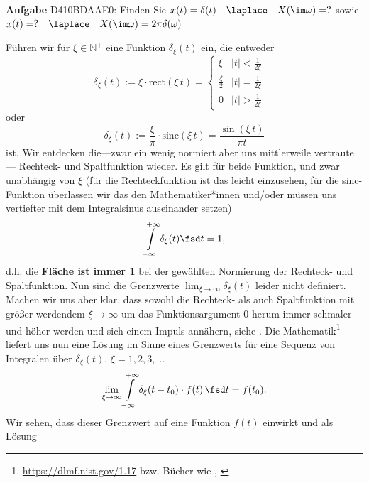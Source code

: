 \textbf{Aufgabe} {\tiny D410BDAAE0}:
Finden Sie $x(t)=\delta(t)\quad \laplace \quad X(\im\omega)=?$ sowie
$x(t)= ? \quad \laplace \quad X(\im\omega)=2\pi \delta(\omega)$
\begin{Werkzeug}
Führen wir für $\xi\in\mathbb{N}^+$ eine Funktion $\delta_\xi(t)$ ein, die entweder
\begin{equation}
\delta_\xi(t) := \xi \cdot \mathrm{rect}(\xi \, t) =
\begin{cases} \xi & |t| < \frac{1}{2 \xi} \\ \frac{\xi}{2} & |t| = \frac{1}{2 \xi} \\ 0 & |t| > \frac{1}{2 \xi} \end{cases}\quad
\end{equation}
oder
\begin{equation}
\delta_\xi(t) := \frac{\xi}{\pi} \cdot \mathrm{sinc}(\xi \, t) = \frac{\sin(\xi \, t)}{\pi t}
\end{equation}
ist.
Wir entdecken die---zwar ein wenig normiert aber uns mittlerweile vertraute---
Rechteck- und Spaltfunktion wieder.
%
Es gilt für beide Funktion, und zwar unabhängig von $\xi$ (für die
Rechteckfunktion ist das leicht einzusehen, für die sinc-Funktion überlassen wir
das den Mathematiker*innen und/oder müssen uns vertiefter mit dem Integralsinus
auseinander setzen)
\begin{equation}
\int\limits_{-\infty}^{+\infty} \delta_\xi(t) \fsd t = 1,
\end{equation}
d.h. die \textbf{Fläche ist immer 1} bei der gewählten Normierung der
Rechteck- und Spaltfunktion.
%
Nun sind die Grenzwerte
$\lim_{\xi\to\infty} \delta_\xi(t)$
leider nicht definiert.
%
Machen wir uns aber klar, dass sowohl die Rechteck- als auch Spaltfunktion mit
größer werdendem $\xi\to \infty$ um das Funktionsargument $0$ herum
immer schmaler und höher werden und sich
einem Impuls annähern, siehe .
%
Die Mathematik\footnote{\url{https://dlmf.nist.gov/1.17} bzw. Bücher wie
\cite[Kapitel 1.15]{Arfken2005}, \cite{Burg2013}}
liefert uns nun eine Lösung im Sinne eines Grenzwerts für eine
Sequenz von Integralen über $\delta_\xi(t)$, $\xi=1,2,3,...$
\begin{equation}
\lim_{\xi\to\infty} \int\limits_{-\infty}^{+\infty}
\delta_\xi(t-t_0) \cdot f(t) \, \fsd t = f(t_0).
\end{equation}
Wir sehen, dass dieser Grenzwert auf eine Funktion $f(t)$ einwirkt und als Lösung

\end{Werkzeug}
